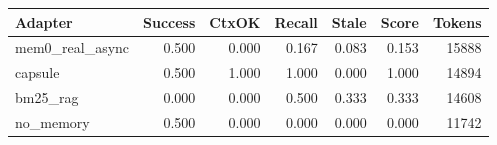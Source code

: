 \begin{tabular}{lrrrrrr}
\hline
Adapter & Success & CtxOK & Recall & Stale & Score & Tokens \\
\hline
mem0\_real\_async & 0.500 & 0.000 & 0.167 & 0.083 & 0.153 & 15888 \\
capsule & 0.500 & 1.000 & 1.000 & 0.000 & 1.000 & 14894 \\
bm25\_rag & 0.000 & 0.000 & 0.500 & 0.333 & 0.333 & 14608 \\
no\_memory & 0.500 & 0.000 & 0.000 & 0.000 & 0.000 & 11742 \\
\hline
\end{tabular}
